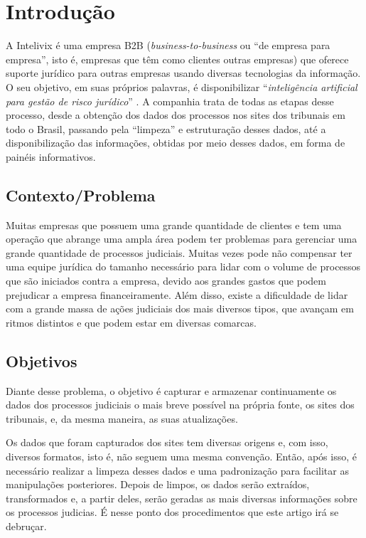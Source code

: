 \section{Introdução}
\label{sec:intro}
A Intelivix é uma empresa B2B (\textit{business-to-business} ou \enquote{de empresa para empresa}, isto é, empresas que têm como clientes outras empresas) que oferece suporte jurídico para outras empresas usando diversas tecnologias da informação. O seu objetivo, em suas próprios palavras, é disponibilizar \enquote{\textit{inteligência artificial para gestão de risco jurídico}} \cite{intelivix:2021}. A companhia trata de todas as etapas desse processo, desde a obtenção dos dados dos processos nos sites dos tribunais em todo o Brasil, passando pela \enquote{limpeza} e estruturação desses dados, até a disponibilização das informações, obtidas por meio desses dados, em forma de painéis informativos.

\subsection{Contexto/Problema}
\label{subsec:contexto}
Muitas empresas que possuem uma grande quantidade de clientes e tem uma operação que abrange uma ampla área podem ter problemas para gerenciar uma grande quantidade de processos judiciais. Muitas vezes pode não compensar ter uma equipe jurídica do tamanho necessário para lidar com o volume de processos que são iniciados contra a empresa, devido aos grandes gastos que podem prejudicar a empresa financeiramente. Além disso, existe a dificuldade de lidar com a grande massa de ações judiciais dos mais diversos tipos, que avançam em ritmos distintos e que podem estar em diversas comarcas.
 

\subsection{Objetivos}
\label{subsec:objetivos}
Diante desse problema, o objetivo é capturar e armazenar continuamente os dados dos processos judiciais o mais breve possível na própria fonte, os sites dos tribunais, e, da mesma maneira, as suas atualizações.

Os dados que foram capturados dos sites tem diversas origens e, com isso, diversos formatos, isto é, não seguem uma mesma convenção. Então, após isso, é necessário realizar a limpeza desses dados e uma padronização para facilitar as manipulações posteriores. Depois de limpos, os dados serão extraídos, transformados e, a partir deles, serão geradas as mais diversas informações sobre os processos judicias. É nesse ponto dos procedimentos que este artigo irá se debruçar.

